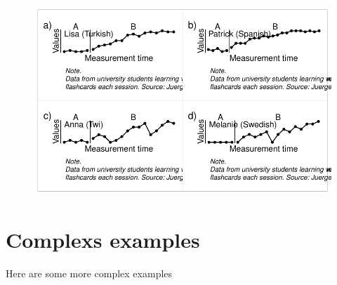 \documentclass[
  letterpaper,
  DIV=11,
  numbers=noendperiod]{scrreprt}
\begin{document}
\begin{figure}[H]

{\centering \includegraphics{./ch_scplot_files/figure-pdf/extend1-1.pdf}

}

\end{figure}

\hypertarget{complexs-examples}{%
\section{Complexs examples}\label{complexs-examples}}

Here are some more complex examples
\end{document}
